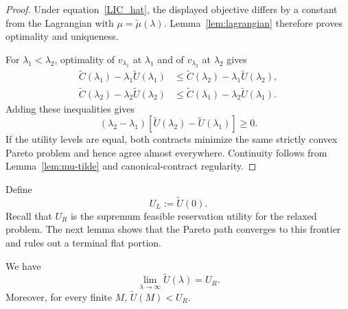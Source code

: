 \begin{proof}
Under equation~\eqref{LIC_hat}, the displayed objective differs by a constant from the
Lagrangian with $\mu=\widetilde\mu(\lambda)$.  Lemma~\ref{lem:lagrangian} therefore proves optimality and uniqueness.

For $\lambda_1<\lambda_2$, optimality of $v_{\lambda_1}$ at
$\lambda_1$ and of $v_{\lambda_2}$ at $\lambda_2$ gives
\begin{align*}
    \widetilde C(\lambda_1)-\lambda_1\widetilde U(\lambda_1)
    &\leq
    \widetilde C(\lambda_2)-\lambda_1\widetilde U(\lambda_2),\\
    \widetilde C(\lambda_2)-\lambda_2\widetilde U(\lambda_2)
    &\leq
    \widetilde C(\lambda_1)-\lambda_2\widetilde U(\lambda_1).
\end{align*}
Adding these inequalities gives
\[
    (\lambda_2-\lambda_1)
    [\widetilde U(\lambda_2)-\widetilde U(\lambda_1)]\geq0.
\]
If the utility levels are equal, both contracts minimize the same strictly
convex Pareto problem and hence agree almost everywhere.  Continuity follows
from Lemma~\ref{lem:mu-tilde} and canonical-contract regularity.
\end{proof}

Define
\[
    U_L:=\widetilde U(0).
\]
Recall that $U_R$ is the supremum feasible reservation utility for the relaxed
problem.  The next lemma shows that the Pareto path converges to this frontier
and rules out a terminal flat portion.

\begin{lemma}
\label{lem:no-terminal-flat}
We have
\[
    \lim_{\lambda\to\infty}\widetilde U(\lambda)=U_R.
\]
Moreover, for every finite $M$, $\widetilde U(M)<U_R$.
\end{lemma}


